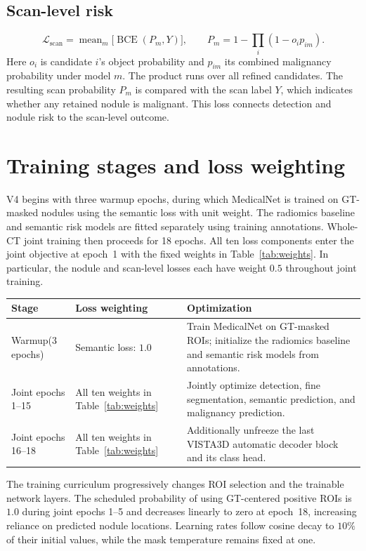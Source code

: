 \documentclass[11pt,a4paper]{article}
\newcommand{\loss}[1]{\mathcal L_{\mathrm{#1}}}
\newcommand{\mean}{\operatorname{mean}}
\newcommand{\BCE}{\operatorname{BCE}}
\newcommand{\lossheading}[1]{\subsection{#1}}
\newenvironment{lossblock}[1]{%
  \par\addvspace{3pt}\noindent\begin{minipage}{\textwidth}%
  \lossheading{#1}%
}{\end{minipage}\par}
\begin{document}
\begin{lossblock}{Scan-level risk}
\[
  \loss{scan}=\mean_m\bigl[\BCE(P_m,Y)\bigr],
  \qquad P_m=1-\prod_i(1-o_i p_{im}).
\]
Here $o_i$ is candidate $i$'s object probability and $p_{im}$ its combined
malignancy probability under model $m$. The product runs over all refined
candidates. The resulting scan probability $P_m$ is compared with the
scan label $Y$, which indicates whether any retained nodule is malignant.
This loss connects detection and nodule risk to the scan-level outcome.
\end{lossblock}

\clearpage
\section{Training stages and loss weighting}

V4 begins with three warmup epochs, during which MedicalNet is trained on
GT-masked nodules using the semantic loss with unit weight. The radiomics
baseline and semantic risk models are fitted separately using training
annotations. Whole-CT joint training then proceeds for 18 epochs.
All ten loss components enter the joint objective at epoch~1 with the
fixed weights in Table~\ref{tab:weights}. In particular, the nodule and
scan-level losses each have weight $0.5$ throughout joint training.

\begin{center}
\label{tab:stages}
\renewcommand{\arraystretch}{1.15}
\begin{tabular}{@{}p{}p{}p{}@{}}
\toprule
Stage & Loss weighting & Optimization\\
\midrule
Warmup\newline (3 epochs)
& Semantic loss: $1.0$
& Train MedicalNet on GT-masked ROIs; initialize the radiomics baseline
and semantic risk models from annotations.\\[4pt]
Joint epochs 1--15
& All ten weights in Table~\ref{tab:weights}
& Jointly optimize detection, fine segmentation, semantic prediction,
and malignancy prediction.\\[4pt]
Joint epochs 16--18
& All ten weights in Table~\ref{tab:weights}
& Additionally unfreeze the last VISTA3D automatic decoder block
and its class head.\\
\bottomrule
\end{tabular}
\end{center}

The training curriculum progressively changes ROI selection and the
trainable network layers. The scheduled probability of using GT-centered
positive ROIs is $1.0$ during joint epochs 1--5 and decreases linearly to
zero at epoch~18, increasing reliance on predicted nodule locations.
Learning rates follow cosine decay to $10\%$ of their initial values,
while the mask temperature remains fixed at one.
\end{document}
